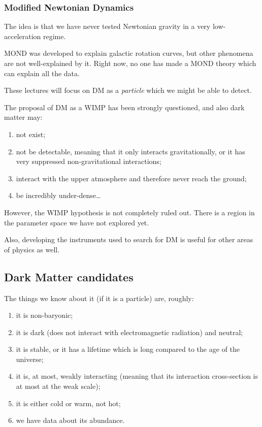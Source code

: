 \documentclass[main.tex]{subfiles}
\begin{document}
\subsubsection{Modified Newtonian Dynamics}

The idea is that we have never tested Newtonian gravity in a very low-acceleration 
regime. 

MOND was developed to explain galactic rotation curves, but other 
phenomena are not well-explained by it. 
Right now, no one has made a MOND theory which can explain all the data. 

These lectures will focus on DM as a \emph{particle} which we might be able 
to detect. 

The proposal of DM as a WIMP has been strongly questioned, and also dark matter may:
\begin{enumerate}
    \item not exist;
    \item not be detectable, meaning that it only interacts gravitationally, or it has very suppressed non-gravitational interactions;
    \item interact with the upper atmosphere and therefore never reach the ground;
    \item be incredibly under-dense\dots
\end{enumerate}

However, the WIMP hypothesis is not completely ruled out.
There is a region in the parameter space we have not explored yet. 

Also, developing the instruments used to search for DM is useful for other areas of 
physics as well. 

\subsection{Dark Matter candidates}

The things we know about it (if it is a particle) are, roughly: 
\begin{enumerate}
    \item it is non-baryonic;
    \item it is dark (does not interact with electromagnetic radiation) and neutral;
    \item it is stable, or it has a lifetime which is long compared to the age of the universe;
    \item it is, at most, weakly interacting (meaning that its interaction cross-section is at most at the weak scale);
    \item it is either cold or warm, not hot;
    \item we have data about its abundance. 
\end{enumerate}
\end{document}
